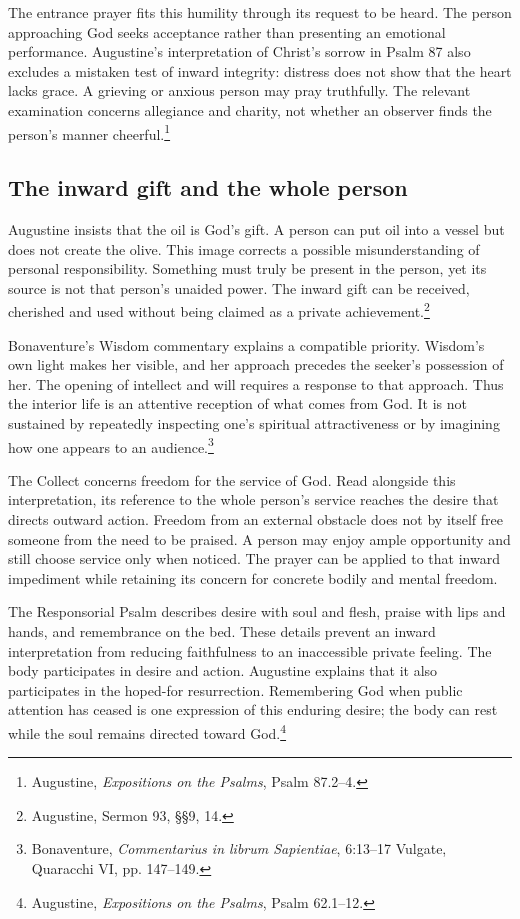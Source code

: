 The entrance prayer fits this humility through its request to be heard. The person approaching God seeks acceptance rather than presenting an emotional performance. Augustine's interpretation of Christ's sorrow in Psalm 87 also excludes a mistaken test of inward integrity: distress does not show that the heart lacks grace. A grieving or anxious person may pray truthfully. The relevant examination concerns allegiance and charity, not whether an observer finds the person's manner cheerful.\footnote{Augustine, \textit{Expositions on the Psalms}, Psalm 87.2--4.}

\subsection{The inward gift and the whole person}
Augustine insists that the oil is God's gift. A person can put oil into a vessel but does not create the olive. This image corrects a possible misunderstanding of personal responsibility. Something must truly be present in the person, yet its source is not that person's unaided power. The inward gift can be received, cherished and used without being claimed as a private achievement.\footnote{Augustine, Sermon 93, §§9, 14.}

Bonaventure's Wisdom commentary explains a compatible priority. Wisdom's own light makes her visible, and her approach precedes the seeker's possession of her. The opening of intellect and will requires a response to that approach. Thus the interior life is an attentive reception of what comes from God. It is not sustained by repeatedly inspecting one's spiritual attractiveness or by imagining how one appears to an audience.\footnote{Bonaventure, \textit{Commentarius in librum Sapientiae}, 6:13--17 Vulgate, Quaracchi VI, pp. 147--149.}

The Collect concerns freedom for the service of God. Read alongside this interpretation, its reference to the whole person's service reaches the desire that directs outward action. Freedom from an external obstacle does not by itself free someone from the need to be praised. A person may enjoy ample opportunity and still choose service only when noticed. The prayer can be applied to that inward impediment while retaining its concern for concrete bodily and mental freedom.

The Responsorial Psalm describes desire with soul and flesh, praise with lips and hands, and remembrance on the bed. These details prevent an inward interpretation from reducing faithfulness to an inaccessible private feeling. The body participates in desire and action. Augustine explains that it also participates in the hoped-for resurrection. Remembering God when public attention has ceased is one expression of this enduring desire; the body can rest while the soul remains directed toward God.\footnote{Augustine, \textit{Expositions on the Psalms}, Psalm 62.1--12.}

